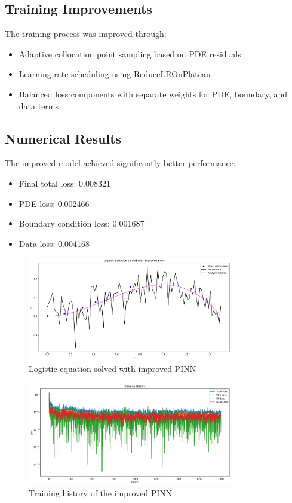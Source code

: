 \documentclass[11pt,a4paper]{article}
\begin{document}
\subsection{Training Improvements}
The training process was improved through:
\begin{itemize}
    \item Adaptive collocation point sampling based on PDE residuals
    \item Learning rate scheduling using ReduceLROnPlateau
    \item Balanced loss components with separate weights for PDE, boundary, and data terms
\end{itemize}

\subsection{Numerical Results}
The improved model achieved significantly better performance:
\begin{itemize}
    \item Final total loss: 0.008321
    \item PDE loss: 0.002466
    \item Boundary condition loss: 0.001687
    \item Data loss: 0.004168
\end{itemize}

\begin{figure}[h]
    \centering
    \includegraphics[width=0.8\textwidth]{figures/pinn_improved.png}
    \caption{Logistic equation solved with improved PINN}
    \label{fig:improved}
\end{figure}

\begin{figure}[h]
    \centering
    \includegraphics[width=0.8\textwidth]{figures/pinn_improved_history.png}
    \caption{Training history of the improved PINN}
    \label{fig:improved_history}
\end{figure}
\end{document}
